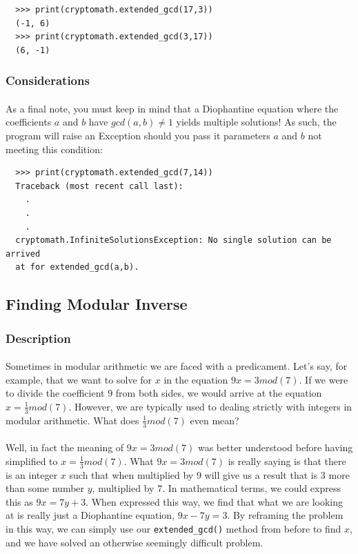 \documentclass[12pt,a4paper]{article}
\begin{document}
\begin{verbatim}
  >>> print(cryptomath.extended_gcd(17,3))
  (-1, 6)
  >>> print(cryptomath.extended_gcd(3,17)) 
  (6, -1)
\end{verbatim}

\subsubsection{Considerations}
\paragraph{}
As a final note, you must keep in mind that a Diophantine equation where the 
coefficients $a$ and $b$ have $gcd(a,b) \neq 1$ yields multiple solutions!  As 
such, the program will raise an Exception should you pass it parameters $a$ and 
$b$ not meeting this condition:

\begin{verbatim}
  >>> print(cryptomath.extended_gcd(7,14))   
  Traceback (most recent call last):
    .
    .
    .
  cryptomath.InfiniteSolutionsException: No single solution can be arrived
  at for extended_gcd(a,b).
\end{verbatim}


\subsection{Finding Modular Inverse}
\subsubsection{Description}
\paragraph{}
Sometimes in modular arithmetic we are faced with a predicament.  Let's say, 
for example, that we want to solve for $x$ in the equation $9x = 3 mod(7)$. If 
we were to divide the coefficient $9$ from both sides, we would arrive at the 
equation $x = \frac{1}{3} mod(7)$.  However, we are typically used to dealing 
strictly with integers in modular arithmetic.  What does $\frac{1}{3} mod(7)$ 
even mean?

\paragraph{}
Well, in fact the meaning of $9x = 3 mod(7)$ was better understood before 
having simplified to $x = \frac{1}{3} mod(7)$.  What $9x = 3 mod(7)$ is really 
saying is that there is an integer $x$ such that when multiplied by $9$ will 
give us a result that is 3 more than some number $y$, multiplied by $7$.  In 
mathematical terms, we could express this as $9x = 7y + 3$.  When expressed 
this way, we find that what we are looking at is really just a Diophantine 
equation, $9x - 7y = 3$.  By reframing the problem in this way, we can simply 
use our \verb|extended_gcd()| method from before to find $x$, and we have 
solved an otherwise seemingly difficult problem.
\end{document}
